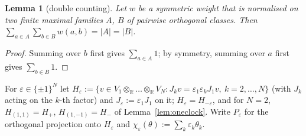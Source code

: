 \documentclass[aps,pra,onecolumn,superscriptaddress,nofootinbib,10pt]{revtex4-2}
\newtheorem{lemma}[theorem]{Lemma}
\theoremstyle{definition}
\theoremstyle{remark}
\newcommand{\R}{\mathbb{R}}
\begin{document}
\begin{lemma}[double counting]\label{lem:double}
Let $w$ be a symmetric weight that is normalised on two finite maximal families $A$, $B$ of pairwise
orthogonal classes.  Then $\sum_{a\in A}\sum_{b\in B}w(a,b)=\lvert A\rvert=\lvert B\rvert$.
\end{lemma}
\begin{proof}
Summing over $b$ first gives $\sum_{a\in A}1$; by symmetry, summing over $a$ first gives $\sum_{b\in B}1$.
\end{proof}

For $\varepsilon\in\{\pm1\}^N$ let $H_\varepsilon:=\{v\in V_1\otimes_\R\dots\otimes_\R V_N: J_kv=\varepsilon_1\varepsilon_kJ_1v,\ k=2,\dots,N\}$ (with
$J_k$ acting on the $k$-th factor) and $J_\varepsilon:=\varepsilon_1J_1$ on it; $H_\varepsilon=H_{-\varepsilon}$, and for $N=2$,
$H_{(1,1)}=H_+$, $H_{(1,-1)}=H_-$ of Lemma~\ref{lem:oneclock}.  Write $P_\varepsilon$ for the orthogonal projection onto
$H_\varepsilon$ and $\chi_\varepsilon(\theta):=\sum_k\varepsilon_k\theta_k$.
\end{document}
